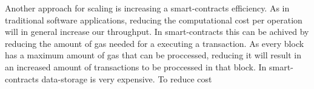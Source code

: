 \documentclass[11pt,twoside,a4paper,final]{book}
\begin{document}
Another approach for scaling is increasing a smart-contracts efficiency. As in traditional software applications, reducing the computational cost per operation will in general increase our throughput. In smart-contracts this can be achived by reducing the amount of gas needed for a executing a transaction. As every block has a maximum amount of gas that can be proccessed, reducing it will result in an increased amount of transactions to be proccessed in that block. In smart-contracts data-storage is very expensive. To reduce cost




\end{document}
